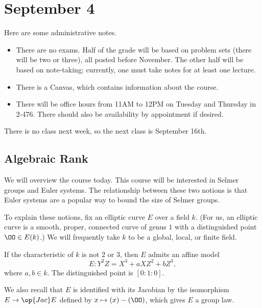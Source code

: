 \documentclass[../notes.tex]{subfiles}
\begin{document}
\section{September 4}
Here are some administrative notes.
\begin{itemize}
	\item There are no exams. Half of the grade will be based on problem sets (there will be two or three), all posted before November. The other half will be based on note-taking; currently, one must take notes for at least one lecture.
	\item There is a Canvas, which contains information about the course.
	\item There will be office hours from 11AM to 12PM on Tuesday and Thursday in 2-476. There should also be availability by appointment if desired.
\end{itemize}
There is no class next week, so the next class is September 16th.

\subsection{Algebraic Rank}
We will overview the course today. This course will be interested in Selmer groups and Euler systems. The relationship between these two notions is that Euler systems are a popular way to bound the size of Selmer groups.

To explain these notions, fix an elliptic curve $E$ over a field $k$. (For us, an elliptic curve is a smooth, proper, connected curve of genus $1$ with a distinguished point $\OO\in E(k)$.) We will frequently take $k$ to be a global, local, or finite field.
\begin{remark}
	If the characteristic of $k$ is not $2$ or $3$, then $E$ admits an affine model
	\[E\colon Y^2Z=X^3+aXZ^2+bZ^3,\]
	where $a,b\in k$. The distinguished point is $[0:1:0]$.
\end{remark}
We also recall that $E$ is identified with its Jacobian by the isomorphism $E\to\op{Jac}E$ defined by $x\mapsto(x)-(\OO)$, which gives $E$ a group law.
\end{document}
